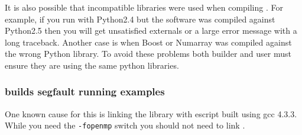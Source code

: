 It is also possible that incompatible libraries were used when compiling \esfinley.
For example, if you run with Python2.4 but the software was compiled against Python2.5 then you will get unsatisfied externals or a large error message with a long traceback.
Another case is when Boost or Numarray was compiled against the wrong Python library.
To avoid these problems both builder and user must ensure they are using the same python libraries.

\subsubsection{\openmp builds segfault running examples}

One known cause for this is linking the  library with escript built using gcc 4.3.3.
While you need the \texttt{-fopenmp} switch you should not need to link .

